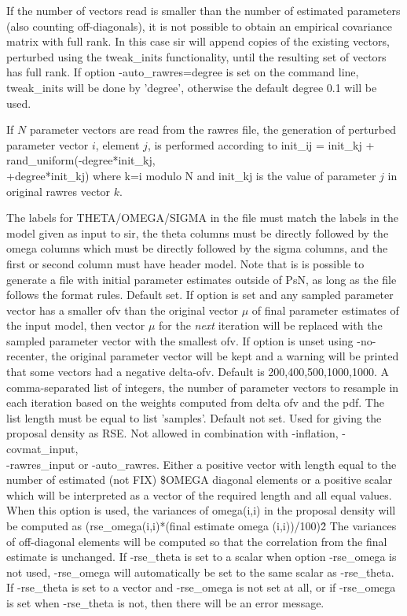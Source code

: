 \begin{optionlist}
If the number of vectors read is smaller than the number of estimated parameters (also counting off-diagonals), it is not possible to obtain an empirical covariance matrix with full rank. In this case sir will append copies of the existing vectors, perturbed using the tweak\_inits functionality, until the resulting set of vectors has full rank. If option -auto\_rawres=degree is set on the command line, tweak\_inits will be done by 'degree', otherwise the default degree 0.1 will be used.

If $N$ parameter vectors are read from the rawres file, the generation of perturbed parameter vector $i$, element $j$, is performed according to  init\_ij = init\_kj + rand\_uniform(-degree*init\_kj,\\+degree*init\_kj) where k=i modulo N and init\_kj is the value of parameter $j$ in original rawres vector $k$.

The labels for  THETA/OMEGA/SIGMA in the file must match the labels in the model given as input to sir, the theta columns must be directly followed by the omega columns which must be directly followed by the sigma columns, and the first or
second column must have header model. Note that is is possible to generate a file with initial parameter estimates outside
of PsN, as long as the file follows the format rules.
\nextopt
{}
Default set. If option is set and any sampled parameter vector has a smaller ofv than the original vector $\mu$ of final parameter estimates of the input model, then vector $\mu$ for the \emph{next} iteration will be replaced with the sampled parameter vector with the smallest ofv. If option is unset using -no-recenter, the original parameter vector will be kept
and a warning will be printed that some vectors had a negative delta-ofv.
\nextopt
{}
Default is 200,400,500,1000,1000. A comma-separated list of integers, the number of parameter vectors to resample in each iteration based on the weights computed from delta ofv and the pdf. The list length must be equal to list 'samples'.
\nextopt
{}
Default not set. Used for giving the proposal density as RSE. %
Not allowed in combination with -inflation, -covmat\_input,\\ -rawres\_input or -auto\_rawres. Either a positive vector with length equal to the number of estimated (not FIX) \$OMEGA diagonal elements or a positive scalar which will be interpreted as a vector of the required length and all equal values. When this option is used, the variances of omega(i,i) in the proposal density will be computed as (rse\_omega(i,i)*(final estimate omega (i,i))/100)\^2 The variances of off-diagonal elements will be computed so that the correlation from the final estimate is unchanged. If -rse\_theta is set to a scalar when option -rse\_omega is not used, -rse\_omega will automatically be set to the same scalar as -rse\_theta. If -rse\_theta is set to a vector and -rse\_omega is not set at all, or if -rse\_omega is set when -rse\_theta is not, then there will be an error message.


\end{optionlist}
